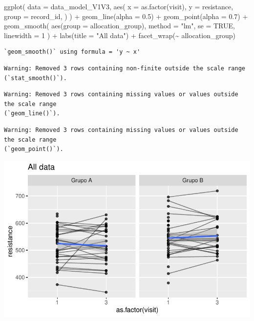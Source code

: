 \documentclass[
  letterpaper,
  DIV=11,
  numbers=noendperiod]{scrartcl}
\newenvironment{Shaded}{\begin{snugshade}}{\end{snugshade}}
\newcommand{\AttributeTok}[1]{\textcolor[rgb]{0.40,0.45,0.13}{#1}}
\newcommand{\ConstantTok}[1]{\textcolor[rgb]{0.56,0.35,0.01}{#1}}
\newcommand{\DecValTok}[1]{\textcolor[rgb]{0.68,0.00,0.00}{#1}}
\newcommand{\FloatTok}[1]{\textcolor[rgb]{0.68,0.00,0.00}{#1}}
\newcommand{\FunctionTok}[1]{\textcolor[rgb]{0.28,0.35,0.67}{#1}}
\newcommand{\NormalTok}[1]{\textcolor[rgb]{0.00,0.23,0.31}{#1}}
\newcommand{\SpecialCharTok}[1]{\textcolor[rgb]{0.37,0.37,0.37}{#1}}
\newcommand{\StringTok}[1]{\textcolor[rgb]{0.13,0.47,0.30}{#1}}
\begin{document}
\begin{Shaded}
\begin{Highlighting}[]
\FunctionTok{ggplot}\NormalTok{(}
    \AttributeTok{data =}\NormalTok{ data\_model\_V1V3, }
    \FunctionTok{aes}\NormalTok{(}
        \AttributeTok{x =} \FunctionTok{as.factor}\NormalTok{(visit),}
        \AttributeTok{y =}\NormalTok{ resistance,}
        \AttributeTok{group =}\NormalTok{ record\_id,}
\NormalTok{    )}
\NormalTok{) }\SpecialCharTok{+}
    \FunctionTok{geom\_line}\NormalTok{(}\AttributeTok{alpha =} \FloatTok{0.5}\NormalTok{) }\SpecialCharTok{+}
    \FunctionTok{geom\_point}\NormalTok{(}\AttributeTok{alpha =} \FloatTok{0.7}\NormalTok{) }\SpecialCharTok{+}
    \FunctionTok{geom\_smooth}\NormalTok{(}
        \FunctionTok{aes}\NormalTok{(}\AttributeTok{group =}\NormalTok{ allocation\_group),}
        \AttributeTok{method =} \StringTok{"lm"}\NormalTok{,}
        \AttributeTok{se =} \ConstantTok{TRUE}\NormalTok{,}
        \AttributeTok{linewidth =} \DecValTok{1}
\NormalTok{    ) }\SpecialCharTok{+}
    \FunctionTok{labs}\NormalTok{(}\AttributeTok{title =} \StringTok{"All data"}\NormalTok{) }\SpecialCharTok{+}
    \FunctionTok{facet\_wrap}\NormalTok{(}\SpecialCharTok{\textasciitilde{}}\NormalTok{ allocation\_group)}
\end{Highlighting}
\end{Shaded}

\begin{verbatim}
`geom_smooth()` using formula = 'y ~ x'
\end{verbatim}

\begin{verbatim}
Warning: Removed 3 rows containing non-finite outside the scale range
(`stat_smooth()`).
\end{verbatim}

\begin{verbatim}
Warning: Removed 3 rows containing missing values or values outside the scale range
(`geom_line()`).
\end{verbatim}

\begin{verbatim}
Warning: Removed 3 rows containing missing values or values outside the scale range
(`geom_point()`).
\end{verbatim}

\includegraphics{Outcomes_V1V2V3_files/figure-pdf/resistance_6-1.pdf}
\end{document}
